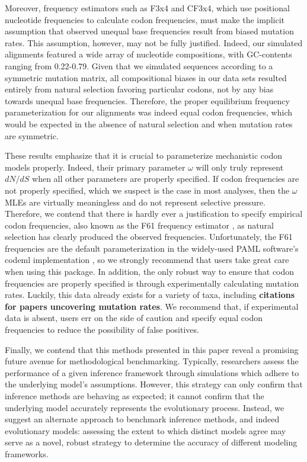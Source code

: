 \documentclass[11pt]{article}
\begin{document}
Moreover, frequency estimators such as F3x4 and CF3x4, which use positional nucleotide frequencies to calculate codon frequencies, must make the implicit assumption that observed unequal base frequencies result from biased mutation rates.
This assumption, however, may not be fully justified. Indeed, our simulated alignments featured a wide array of nucleotide compositions, with GC-contents ranging from 0.22-0.79. Given that we simulated sequences according to a symmetric mutation matrix, all compositional biases in our data sets resulted entirely from natural selection favoring particular codons, not by any bias towards unequal base frequencies. Therefore, the proper equilibrium frequency parameterization for our alignments was indeed equal codon frequencies, which would be expected in the absence of natural selection and when mutation rates are symmetric. 

These results emphasize that it is crucial to parameterize mechanistic codon models properly. Indeed, their primary parameter $\omega$ will only truly represent $dN/dS$ when all other parameters are properly specified. If codon frequencies are not properly specified, which we suspect is the case in most analyses, then the $\omega$ MLEs are virtually meaningless and do not represent selective pressure. Therefore, we contend that there is hardly ever a justification to specify empirical codon frequencies, also known as the F61 frequency estimator \cite{GoldmanYang1994}, as natural selection has clearly produced the observed frequencies. Unfortunately, the F61 frequencies are the default parameterization in the widely-used PAML software's codeml implementation \cite{Yang2007}, so we strongly recommend that users take great care when using this package.
In addition, the only robust way to ensure that codon frequencies are properly specified is through experimentally calculating mutation rates. Luckily, this data already exists for a variety of taxa, including \textbf{citations for papers uncovering mutation rates}.  We recommend that, if experimental data is absent, users err on the side of caution and specify equal codon frequencies to reduce the possibility of false positives.


Finally, we contend that this methods presented in this paper reveal a promising future avenue for methodological benchmarking. Typically, researchers assess the performance of a given inference framework through simulations which adhere to the underlying model's assumptions. However, this strategy can only confirm that inference methods are behaving as expected; it cannot confirm that the underlying model accurately represents the evolutionary process. Instead, we suggest an alternate approach to benchmark inference methods, and indeed evolutionary models: assessing the extent to which distinct models agree may serve as a novel, robust strategy to determine the accuracy of different modeling frameworks.
\end{document}
